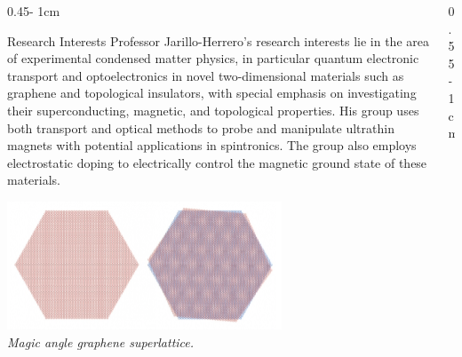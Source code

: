 \documentclass{../psuposter}
\begin{document}
\begin{frame}
\begin{columns}[t, totalwidth=\textwidth]
\begin{column}{0.45\textwidth - 1cm}
    \begin{block}{Research Interests}
        Professor Jarillo-Herrero's research interests lie in the area of experimental condensed matter physics, in particular quantum electronic transport and optoelectronics in novel two-dimensional materials such as graphene and topological insulators, with special emphasis on investigating their superconducting, magnetic, and topological properties. His group uses both transport and optical methods to probe and manipulate ultrathin magnets with potential applications in spintronics. The group also employs electrostatic doping to electrically control the magnetic ground state of these materials.

        \begin{center}
	    	\includegraphics[width=0.65\textwidth]{images/research}\\       
	    	\textit{Magic angle graphene superlattice.} 		
    	\end{center}


    \end{block}
\end{column}
\begin{column}{0.55\textwidth - 1cm}



\end{column}
\end{columns}
\end{frame}
\end{document}
